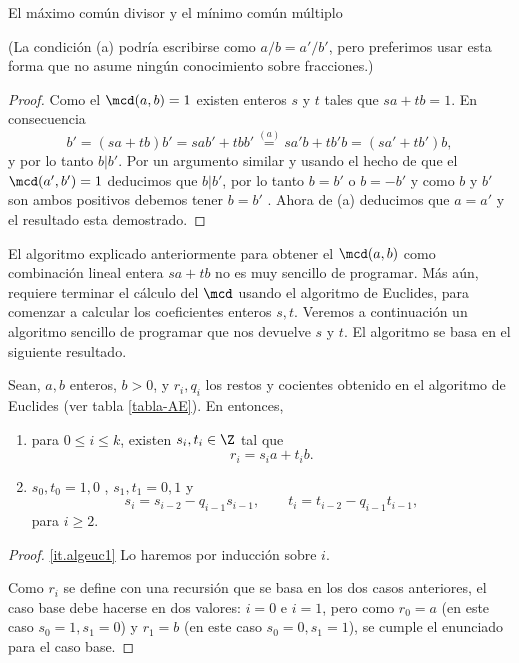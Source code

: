 \begin{section}{El máximo común divisor y el mínimo común
múltiplo}
\begin{ejemplo*}
(La condición ({a}) podría escribirse como $a/b=a'/b'$, pero
preferimos usar esta forma que no asume ningún conocimiento sobre
fracciones.)
\end{ejemplo*}
\begin{proof} Como el $\mcd (a,b) =1$ existen enteros $s$ y $t$
tales que $sa+tb=1$. En consecuencia
$$
b'=(sa+tb)b' =sab'+tbb' \overset{(a)}{=} sa'b + tb'b = (sa'+tb')b,
$$
y por lo tanto $b|b'$. Por un argumento similar y usando el hecho
de que el $\mcd(a',b')=1 $ deducimos que $b|b'$, por lo tanto
$b=b'$ o $b=-b'$ y como $b $ y $b'$ son ambos positivos debemos
tener $b=b'$ . Ahora de (a) deducimos que $a=a'$ y el resultado
esta demostrado.
\end{proof}


\begin{observacion*}[*]
El  algoritmo explicado anteriormente para obtener el $\mcd(a,b)$ como combinación lineal entera $sa+tb$ no es muy sencillo de programar. Más aún, requiere terminar el cálculo del $\mcd$ usando el algoritmo de Euclides, para comenzar a calcular los coeficientes enteros $s,t$. Veremos a continuación un algoritmo sencillo de programar que nos devuelve $s$ y $t$. El algoritmo se basa en el siguiente resultado. 

\begin{proposicion}\label{prop-alg-euclides-2} Sean, $a,b$ enteros, $b>0$, y $r_i, q_i$ los restos y cocientes obtenido en el algoritmo de Euclides (ver tabla \ref{tabla-AE}). En entonces, 
\begin{enumerate}[label=\textit{\alph*)}]
    \item\label{it.algeuc1}     para $0 \le i \le k$,  existen $s_i, t_i \in \Z$ tal que
    \begin{equation*}
    r_i = s_ia + t_ib.
    \end{equation*}
    \item\label{it.algeuc2} $s_0, t_0 = 1, 0$ , $s_1, t_1 = 0, 1$ y 
    \begin{equation}
    s_{i} = s_{i-2} - q_{i-1}  s_{i-1}, \qquad t_{i} = t_{i-2} - q_{i-1}  t_{i-1},
    \end{equation}
    para $i \ge 2$.
\end{enumerate}
\end{proposicion}
\begin{proof}
    \ref{it.algeuc1} Lo haremos por inducción sobre $i$.
    
    Como $r_i$ se define con una recursión que se basa en los dos casos anteriores, el caso base debe hacerse en dos valores: $i=0$ e $i=1$, pero como  $r_0 = a$ (en este caso $s_0=1, s_1 =0$) y $r_1 =b$ (en este caso $s_0=0, s_1 =1$), se cumple el enunciado para el caso base. 
    

\end{proof}
\end{observacion*}
\end{section}

